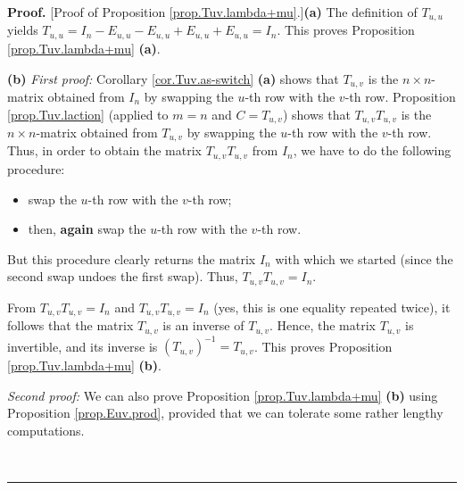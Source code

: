 \documentclass[numbers=enddot,12pt,final,onecolumn,notitlepage]{scrartcl}%
\theoremstyle{definition}
\newenvironment{proof}[1][Proof]{\noindent\textbf{#1.} }{\ \rule{0.5em}{0.5em}}
\begin{document}
\begin{proof}
[Proof of Proposition \ref{prop.Tuv.lambda+mu}.]\textbf{(a)} The definition of
$T_{u,u}$ yields $T_{u,u}=I_{n}-E_{u,u}-E_{u,u}+E_{u,u}+E_{u,u}=I_{n}$. This
proves Proposition \ref{prop.Tuv.lambda+mu} \textbf{(a)}.

\textbf{(b)} \textit{First proof:} Corollary \ref{cor.Tuv.as-switch}
\textbf{(a)} shows that $T_{u,v}$ is the $n\times n$-matrix obtained from
$I_{n}$ by swapping the $u$-th row with the $v$-th row. Proposition
\ref{prop.Tuv.laction} (applied to $m=n$ and $C=T_{u,v}$) shows that
$T_{u,v}T_{u,v}$ is the $n\times n$-matrix obtained from $T_{u,v}$ by swapping
the $u$-th row with the $v$-th row. Thus, in order to obtain the matrix
$T_{u,v}T_{u,v}$ from $I_{n}$, we have to do the following procedure:

\begin{itemize}
\item swap the $u$-th row with the $v$-th row;

\item then, \textbf{again} swap the $u$-th row with the $v$-th row.
\end{itemize}

But this procedure clearly returns the matrix $I_{n}$ with which we started
(since the second swap undoes the first swap). Thus, $T_{u,v}T_{u,v}=I_{n}$.

From $T_{u,v}T_{u,v}=I_{n}$ and $T_{u,v}T_{u,v}=I_{n}$ (yes, this is one
equality repeated twice), it follows that the matrix $T_{u,v}$ is an inverse
of $T_{u,v}$. Hence, the matrix $T_{u,v}$ is invertible, and its inverse is
$\left(  T_{u,v}\right)  ^{-1}=T_{u,v}$. This proves Proposition
\ref{prop.Tuv.lambda+mu} \textbf{(b)}.

\textit{Second proof:} We can also prove Proposition \ref{prop.Tuv.lambda+mu}
\textbf{(b)} using Proposition \ref{prop.Euv.prod}, provided that we can
tolerate some rather lengthy computations.


\end{proof}
\end{document}
